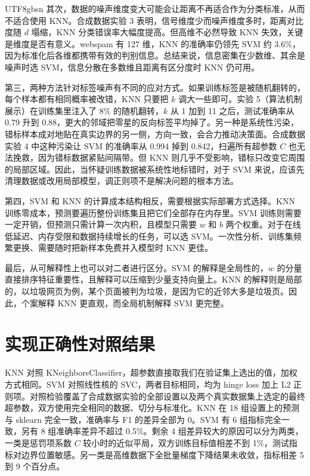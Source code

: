 \documentclass{article}
\begin{document}
\begin{CJK}{UTF8}{gbsn}
其次，数据的噪声维度变大可能会让距离不再适合作为分类标准，从而不适合使用 KNN。合成数据实验 3 表明，信号维度少而噪声维度多时，距离对比度随 $d$ 塌缩，KNN 分类错误率大幅度提高。但高维不必然导致 KNN 失效，关键是维度是否有意义。webspam 有 127 维，KNN 的准确率仍领先 SVM 约 3.6\%，因为标准化后各维都携带有效的判别信息。总结来说，信息密集在少数维、其余是噪声时选 SVM，信息分散在多数维且距离有区分度时 KNN 仍可用。

第三，两种方法针对标签噪声有不同的应对方式。如果训练标签是被随机翻转的，每个样本都有相同概率被改错，KNN 只要把 $k$ 调大一些即可。实验 5（算法机制展示）在训练集里注入了 8\% 的随机翻转，$k$ 从 1 加到 11 之后，测试准确率从 0.79 升到 0.88，更大的邻域把零星的反向标签平均掉了。另一种是系统性污染，错标样本成对地贴在真实边界的另一侧，方向一致，会合力推动决策面。合成数据实验 4 中这种污染让 SVM 的准确率从 0.994 掉到 0.842，扫遍所有超参数 $C$ 也无法挽救，因为错标数据紧贴间隔带。但 KNN 则几乎不受影响，错标只改变它周围的局部区域。因此，当怀疑训练数据被系统性地标错时，对于 SVM 来说，应该先清理数据或改用局部模型，调正则项不是解决问题的根本方法。

第四，SVM 和 KNN 的计算成本结构相反，需要根据实际部署方式选择。KNN 训练零成本，预测要遍历整份训练集且把它们全部存在内存里。SVM 训练则需要一定开销，但预测只需计算一次内积，且模型只需要 $w$ 和 $b$ 两个权重。对于在线低延迟、内存受限和数据持续增长的任务，可以选 SVM。一次性分析、训练集频繁更换、需要随时把新样本免费并入模型时 KNN 更佳。

最后，从可解释性上也可以对二者进行区分。SVM 的解释是全局性的，$w$ 的分量直接排序特征重要性，且解释可以压缩到少量支持向量上。KNN 的解释则是局部的，以垃圾网页为例，某个页面被判为垃圾，是因为它的近邻大多是垃圾页。因此，个案解释 KNN 更直观，而全局机制解释 SVM 更完整。

\appendix
\renewcommand{\thesection}{附录~\Alph{section}}
\renewcommand{\thetable}{A\arabic{table}}
\setcounter{table}{0}

\section{实现正确性对照结果}

KNN 对照 KNeighborsClassifier，超参数直接取我们在验证集上选出的值，加权方式相同。SVM 对照线性核的 SVC，两者目标相同，均为 hinge loss 加上 L2 正则项。对照检验覆盖了合成数据实验的全部设置以及两个真实数据集上选定的最终超参数，双方使用完全相同的数据、切分与标准化。KNN 在 18 组设置上的预测与 sklearn 完全一致，准确率与 F1 的差异全部为 0。SVM 有 6 组指标完全一致，另有 8 组准确率差异不超过 0.5\%。剩余 4 组差异较大的原因可以分为两类，一类是惩罚项系数 $C$ 较小时的近似平局，双方训练目标值相差不到 1\%，测试指标对边界位置敏感。另一类是高维数据下全批量梯度下降结果未收敛，指标相差 5 到 9 个百分点。


\end{CJK}
\end{document}
